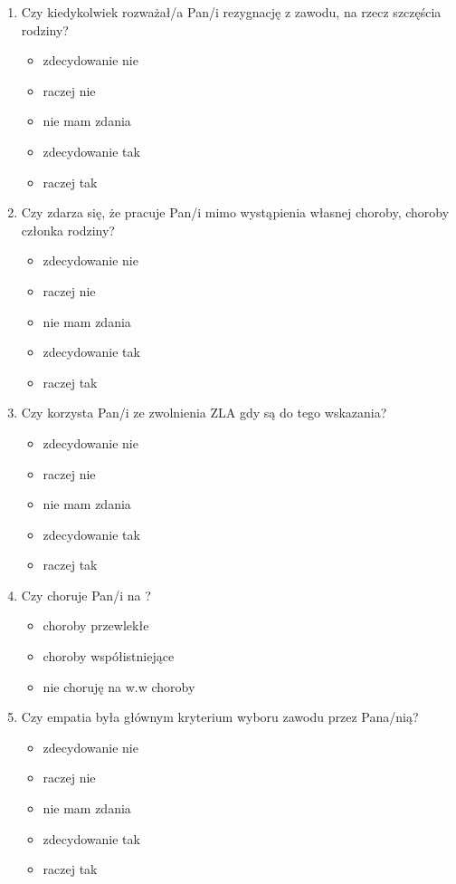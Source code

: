 \documentclass[a4paper,12pt,twoside,openright]{mwrep}
\begin{document}
\begin{appendices}
\begin{enumerate}[label=\arabic*)]
			\item{Czy kiedykolwiek rozważał/a Pan/i rezygnację z zawodu, na rzecz szczęścia rodziny?}
		\begin{itemize}
			\item{zdecydowanie nie}
			\item{raczej nie}
			\item{nie mam zdania}
			\item{zdecydowanie tak}
			\item{raczej tak}
		\end{itemize}
		\vspace{\baselineskip}
		
			\item{Czy zdarza się, że pracuje Pan/i mimo wystąpienia własnej choroby, choroby członka rodziny?}
		\begin{itemize}
			\item{zdecydowanie nie}
			\item{raczej nie}
			\item{nie mam zdania}
			\item{zdecydowanie tak}
			\item{raczej tak}
		\end{itemize}
		\vspace{\baselineskip}
		
			\item{ Czy korzysta Pan/i ze zwolnienia ZLA gdy są do tego wskazania?}
		\begin{itemize}
			\item{zdecydowanie nie}
			\item{raczej nie}
			\item{nie mam zdania}
			\item{zdecydowanie tak}
			\item{raczej tak}
		\end{itemize}
		\vspace{\baselineskip}
		
			\item{Czy choruje Pan/i  na ?}
		\begin{itemize}
			\item{choroby przewlekłe}
			\item{choroby współistniejące}
			\item{nie choruję na w.w choroby}
			\end{itemize}
		\vspace{\baselineskip}
		
			\item{Czy empatia była głównym kryterium wyboru zawodu przez Pana/nią?}
		\begin{itemize}
			\item{zdecydowanie nie}
			\item{raczej nie}
			\item{nie mam zdania}
			\item{zdecydowanie tak}
			\item{raczej tak}
		\end{itemize}
		\vspace{\baselineskip}
		

\end{enumerate}
\end{appendices}
\end{document}
